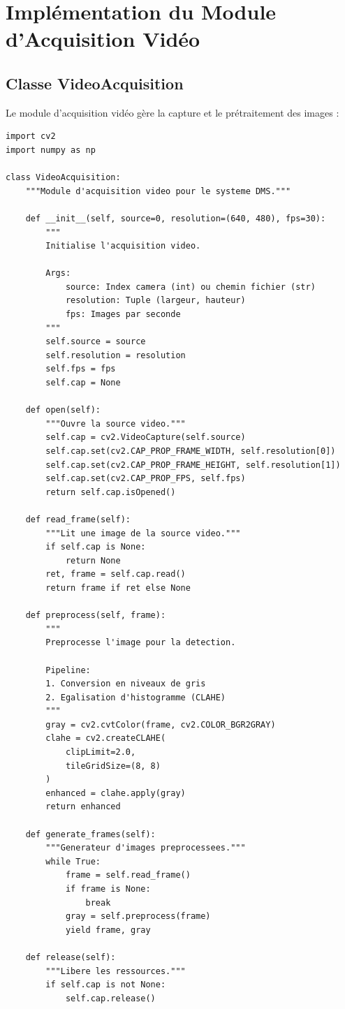 \documentclass[12pt,a4paper,twoside]{report}
\begin{document}
\section{Implémentation du Module d'Acquisition Vidéo}

\subsection{Classe VideoAcquisition}

Le module d'acquisition vidéo gère la capture et le prétraitement des images :

\begin{lstlisting}[style=pythonstyle, caption={Module d'acquisition vidéo.}, label={lst:video_acquisition}]
import cv2
import numpy as np

class VideoAcquisition:
    """Module d'acquisition video pour le systeme DMS."""
    
    def __init__(self, source=0, resolution=(640, 480), fps=30):
        """
        Initialise l'acquisition video.
        
        Args:
            source: Index camera (int) ou chemin fichier (str)
            resolution: Tuple (largeur, hauteur)
            fps: Images par seconde
        """
        self.source = source
        self.resolution = resolution
        self.fps = fps
        self.cap = None
    
    def open(self):
        """Ouvre la source video."""
        self.cap = cv2.VideoCapture(self.source)
        self.cap.set(cv2.CAP_PROP_FRAME_WIDTH, self.resolution[0])
        self.cap.set(cv2.CAP_PROP_FRAME_HEIGHT, self.resolution[1])
        self.cap.set(cv2.CAP_PROP_FPS, self.fps)
        return self.cap.isOpened()
    
    def read_frame(self):
        """Lit une image de la source video."""
        if self.cap is None:
            return None
        ret, frame = self.cap.read()
        return frame if ret else None
    
    def preprocess(self, frame):
        """
        Preprocesse l'image pour la detection.
        
        Pipeline:
        1. Conversion en niveaux de gris
        2. Egalisation d'histogramme (CLAHE)
        """
        gray = cv2.cvtColor(frame, cv2.COLOR_BGR2GRAY)
        clahe = cv2.createCLAHE(
            clipLimit=2.0, 
            tileGridSize=(8, 8)
        )
        enhanced = clahe.apply(gray)
        return enhanced
    
    def generate_frames(self):
        """Generateur d'images preprocessees."""
        while True:
            frame = self.read_frame()
            if frame is None:
                break
            gray = self.preprocess(frame)
            yield frame, gray
    
    def release(self):
        """Libere les ressources."""
        if self.cap is not None:
            self.cap.release()
\end{lstlisting}
\end{document}
